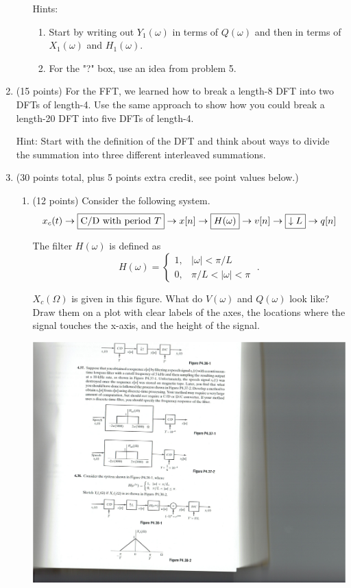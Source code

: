 \documentclass[]{siamltex}
\begin{document}
\begin{enumerate}
\begin{enumerate}
	Hints: \begin{enumerate}
			\item Start by writing out $Y_1(\omega)$ in terms of $Q(\omega)$ and then in terms of $X_1(\omega)$ and $H_1(\omega)$.
			\item For the "?" box, use an idea from problem 5.
			\end{enumerate}
	
	\end{enumerate}



\newpage
\item (15 points) For the FFT, we learned how to break a length-8 DFT into two DFTs of length-4. Use the same approach to show how you could break a length-20 DFT into five DFTs of length-4. 

Hint: Start with the definition of the DFT and think about ways to divide the summation into three different interleaved summations.






\newpage

\item (30 points total, plus 5 points extra credit, see point values below.) 
	\begin{enumerate}
	\item (12 points) Consider the following system. $$x_c(t)  \rightarrow \fbox{C/D with period $T$}  \rightarrow x[n] \rightarrow   \fbox{$H(\omega)$} \rightarrow v[n] \rightarrow \fbox{$\downarrow L$} \rightarrow q[n] $$
	
	The filter $H(\omega)$ is defined as $$H(\omega) = \left\{ \begin{matrix} 1, & |\omega| < \pi/L \\ 0 , & \pi/L < |\omega| < \pi\end{matrix} \right. \;.$$
	
	$X_c(\Omega)$ is given in this figure. What do $V(\omega)$ and $Q(\omega)$ look like? Draw them on a plot with clear labels of the axes, the locations where the signal touches the x-axis, and the height of the signal.
	
	\includegraphics{osb4382}
	

\end{enumerate}
\end{enumerate}
\end{document}
